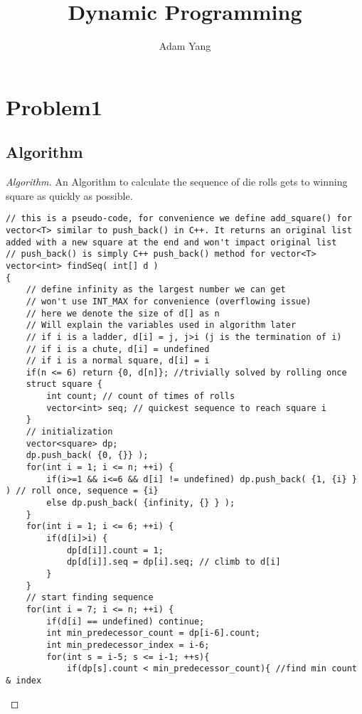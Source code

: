 \documentclass[openany]{article}
\begin{document}
\title{Dynamic Programming}
\author{Adam Yang}
\maketitle




\section*{Problem1}

\subsection*{Algorithm}
\begin{proof}[Algorithm]{}
		\renewcommand{\qedsymbol}{}
		An Algorithm to calculate the sequence of die rolls gets to winning square as quickly as possible.
		\begin{lstlisting}[basicstyle=\fontsize{8}{9}\selectfont\ttfamily]
// this is a pseudo-code, for convenience we define add_square() for vector<T> similar to push_back() in C++. It returns an original list added with a new square at the end and won't impact original list
// push_back() is simply C++ push_back() method for vector<T>
vector<int> findSeq( int[] d )
{
    // define infinity as the largest number we can get
    // won't use INT_MAX for convenience (overflowing issue)
    // here we denote the size of d[] as n
    // Will explain the variables used in algorithm later
    // if i is a ladder, d[i] = j, j>i (j is the termination of i)
    // if i is a chute, d[i] = undefined
    // if i is a normal square, d[i] = i
    if(n <= 6) return {0, d[n]}; //trivially solved by rolling once
    struct square {
        int count; // count of times of rolls
        vector<int> seq; // quickest sequence to reach square i
    }
    // initialization
    vector<square> dp;
    dp.push_back( {0, {}} );
    for(int i = 1; i <= n; ++i) {
        if(i>=1 && i<=6 && d[i] != undefined) dp.push_back( {1, {i} } ) // roll once, sequence = {i}
        else dp.push_back( {infinity, {} } );
    }
    for(int i = 1; i <= 6; ++i) {
        if(d[i]>i) {
            dp[d[i]].count = 1;
            dp[d[i]].seq = dp[i].seq; // climb to d[i]
        }
    }
    // start finding sequence
    for(int i = 7; i <= n; ++i) {
        if(d[i] == undefined) continue;
        int min_predecessor_count = dp[i-6].count;
        int min_predecessor_index = i-6;
        for(int s = i-5; s <= i-1; ++s){
            if(dp[s].count < min_predecessor_count){ //find min count & index

\end{lstlisting}
\end{proof}
\end{document}
